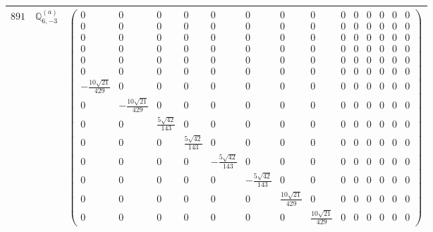 \documentclass[fleqn,8pt,landscape]{jsarticle}
\begin{document}
\begin{center}
\begin{longtable}{ccc}
$ 891 $ & $ \mathbb{Q}_{6,-3}^{(a)} $ & $ \begin{pmatrix} 0 & 0 & 0 & 0 & 0 & 0 & 0 & 0 & 0 & 0 & 0 & 0 & 0 & 0 \\ 0 & 0 & 0 & 0 & 0 & 0 & 0 & 0 & 0 & 0 & 0 & 0 & 0 & 0 \\ 0 & 0 & 0 & 0 & 0 & 0 & 0 & 0 & 0 & 0 & 0 & 0 & 0 & 0 \\ 0 & 0 & 0 & 0 & 0 & 0 & 0 & 0 & 0 & 0 & 0 & 0 & 0 & 0 \\ 0 & 0 & 0 & 0 & 0 & 0 & 0 & 0 & 0 & 0 & 0 & 0 & 0 & 0 \\ 0 & 0 & 0 & 0 & 0 & 0 & 0 & 0 & 0 & 0 & 0 & 0 & 0 & 0 \\ - \frac{10 \sqrt{21}}{429} & 0 & 0 & 0 & 0 & 0 & 0 & 0 & 0 & 0 & 0 & 0 & 0 & 0 \\ 0 & - \frac{10 \sqrt{21}}{429} & 0 & 0 & 0 & 0 & 0 & 0 & 0 & 0 & 0 & 0 & 0 & 0 \\ 0 & 0 & \frac{5 \sqrt{42}}{143} & 0 & 0 & 0 & 0 & 0 & 0 & 0 & 0 & 0 & 0 & 0 \\ 0 & 0 & 0 & \frac{5 \sqrt{42}}{143} & 0 & 0 & 0 & 0 & 0 & 0 & 0 & 0 & 0 & 0 \\ 0 & 0 & 0 & 0 & - \frac{5 \sqrt{42}}{143} & 0 & 0 & 0 & 0 & 0 & 0 & 0 & 0 & 0 \\ 0 & 0 & 0 & 0 & 0 & - \frac{5 \sqrt{42}}{143} & 0 & 0 & 0 & 0 & 0 & 0 & 0 & 0 \\ 0 & 0 & 0 & 0 & 0 & 0 & \frac{10 \sqrt{21}}{429} & 0 & 0 & 0 & 0 & 0 & 0 & 0 \\ 0 & 0 & 0 & 0 & 0 & 0 & 0 & \frac{10 \sqrt{21}}{429} & 0 & 0 & 0 & 0 & 0 & 0 \end{pmatrix} $ \\ \hline

\end{longtable}
\end{center}
\end{document}
